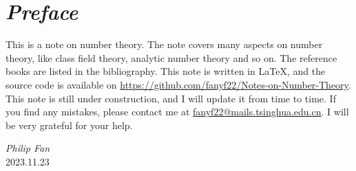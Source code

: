 \chapter*{\emph{Preface}}

This is a note on number theory. The note covers many aspects on number theory, like class field theory, analytic number theory and so on. The reference books are listed in the bibliography. This note is written in \LaTeX, and the source code is available on \href{https://github.com/fanyf22/Notes-on-Number-Theory}{https://github.com/fanyf22/Notes-on-Number-Theory}. This note is still under construction, and I will update it from time to time. If you find any mistakes, please contact me at \href{mailto:fanyf22@mails.tsinghua.edu.cn}{fanyf22@mails.tsinghua.edu.cn}. I will be very grateful for your help.

\begin{flushright}
\emph{Philip Fan} \\
2023.11.23
\end{flushright}
